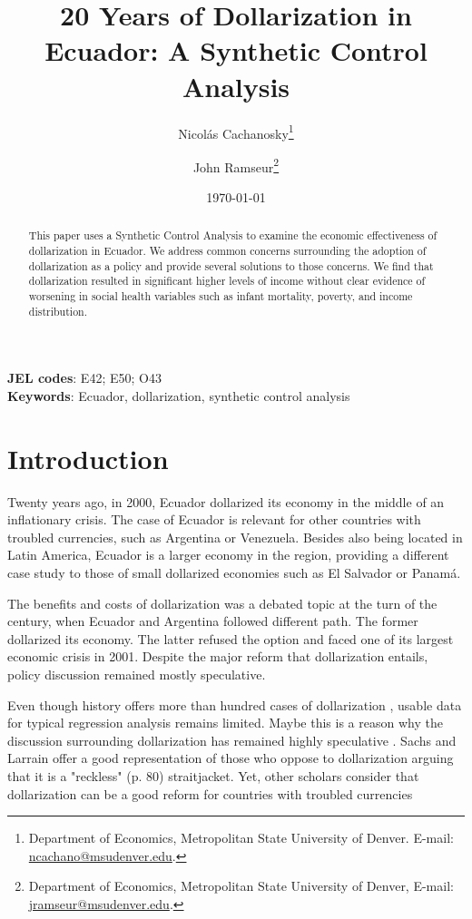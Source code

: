 \documentclass[12pt]{article}
\title{20 Years of Dollarization in Ecuador: A Synthetic Control Analysis}
\author{Nicolás Cachanosky\thanks{Department of Economics, Metropolitan State University of Denver. E-mail: \href{mailto:ncachano@msudenver.edu}{ncachano@msudenver.edu}.} \and John Ramseur\thanks{Department of Economics, Metropolitan State University of Denver, E-mail: \href{mailto:jramseur@msudenver.edu}{jramseur@msudenver.edu}.}}
\date{\today}
\begin{document}

\maketitle

\begin{abstract}
\noindent
This paper uses a Synthetic Control Analysis to examine the economic effectiveness of dollarization in Ecuador. We address common concerns surrounding the adoption of dollarization as a policy and provide several solutions to those concerns. We find that dollarization resulted in significant higher levels of income without clear evidence of worsening in social health variables such as infant mortality, poverty, and income distribution.
\end{abstract}

\footnotesize \noindent \textbf{JEL codes}: E42; E50; O43 \\
\footnotesize \noindent \textbf{Keywords}: Ecuador, dollarization, synthetic control analysis

\newpage
\doublespacing

\section{Introduction} 
    \label{sec:intro}

Twenty years ago, in 2000, Ecuador dollarized its economy in the middle of an inflationary crisis. The case of Ecuador is relevant for other countries with troubled currencies, such as Argentina or Venezuela. Besides also being located in Latin America, Ecuador is a larger economy in the region, providing a different case study to those of small dollarized economies such as El Salvador or Panamá. 

The benefits and costs of dollarization was a debated topic at the turn of the century, when Ecuador and Argentina followed different path. The former dollarized its economy. The latter refused the option and faced one of its largest economic crisis in 2001. Despite the major reform that dollarization entails, policy discussion remained mostly speculative. 

Even though history offers more than hundred cases of dollarization \parencite{Schuler2005}, usable data for typical regression analysis remains limited. Maybe this is a reason why the discussion surrounding dollarization has remained highly speculative \parencite[for a sample see][]{Levy-Yeyati2002,Salvatore2003}. Sachs and Larrain \parencite*{Sachs1999} offer a good representation of those who oppose to dollarization arguing that it is a "reckless" (p. 80) straitjacket. Yet, other scholars consider that dollarization can be a good reform for countries with troubled currencies  \parencite{Avila2018,Cochrane2018,Gale2002,Hanke2003a,White2014a} 
\end{document}
